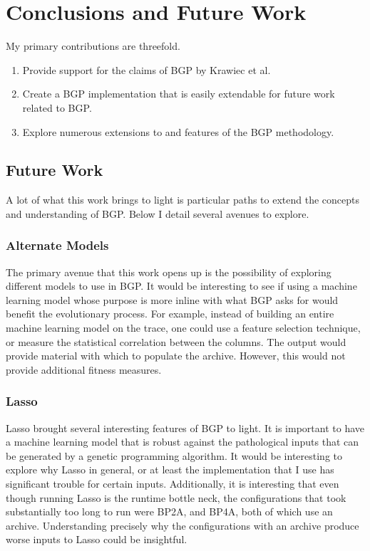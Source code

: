 \section{Conclusions and Future Work}\label{sect:conc}
My primary contributions are threefold.

\begin{enumerate}[noitemsep]
\item Provide support for the claims of BGP by Krawiec et al.
\item Create a BGP implementation that is easily extendable for future work related to BGP.
\item Explore numerous extensions to and features of the BGP methodology.
\end{enumerate}

\subsection{Future Work}\label{section:future_work}
A lot of what this work brings to light is particular paths to extend the concepts and understanding of BGP.  Below I detail several avenues to explore.

\subsubsection{Alternate Models}
The primary avenue that this work opens up is the possibility of exploring different models to use in BGP.  It would be interesting to see if using a machine learning model whose purpose is more inline with what BGP asks for would benefit the evolutionary process.  For example, instead of building an entire machine learning model on the trace, one could use a feature selection technique, or measure the statistical correlation between the columns.  The output would provide material with which to populate the archive.  However, this would not provide additional fitness measures.

\subsubsection{Lasso}
Lasso brought several interesting features of BGP to light.  It is important to have a machine learning model that is robust against the pathological inputs that can be generated by a genetic programming algorithm.  It would be interesting to explore why Lasso in general, or at least the implementation that I use has significant trouble for certain inputs.  Additionally, it is interesting that even though running Lasso is the runtime bottle neck, the configurations that took substantially too long to run were BP2A, and BP4A, both of which use an archive.  Understanding precisely why the configurations with an archive produce worse inputs to Lasso could be insightful.

